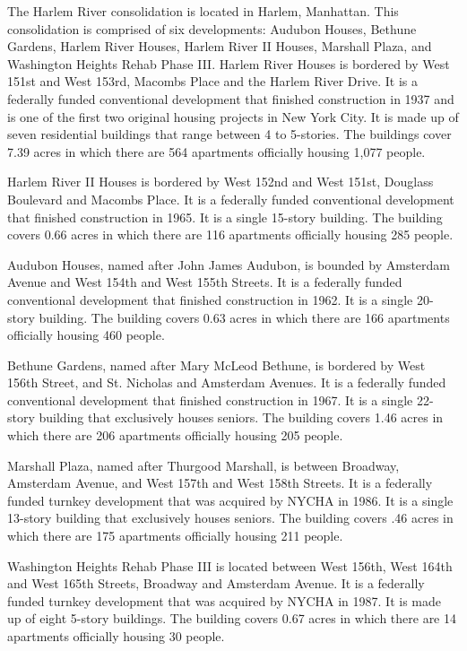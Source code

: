 The Harlem River consolidation is located in Harlem, Manhattan. This consolidation is comprised of six developments: Audubon Houses, Bethune Gardens, Harlem River Houses, Harlem River II Houses, Marshall Plaza, and Washington Heights Rehab Phase III. Harlem River Houses is bordered by West 151st and West 153rd, Macombs Place and the Harlem River Drive. It is a federally funded conventional development that finished construction in 1937 and is one of the first two original housing projects in New York City. It is made up of seven residential buildings that range between 4 to 5-stories. The buildings cover 7.39 acres in which there are 564 apartments officially housing 1,077 people. \par \vspace{.7\baselineskip}Harlem River II Houses is bordered by West 152nd and West 151st, Douglass Boulevard and Macombs Place. It is a federally funded conventional development that finished construction in 1965. It is a single 15-story building. The building covers 0.66 acres in which there are 116 apartments officially housing 285 people. \par \vspace{.7\baselineskip}Audubon Houses, named after John James Audubon, is bounded by Amsterdam Avenue and West 154th and West 155th Streets. It is a federally funded conventional development that finished construction in 1962. It is a single 20-story building. The building covers 0.63 acres in which there are 166 apartments officially housing 460 people. \par \vspace{.7\baselineskip}Bethune Gardens, named after Mary McLeod Bethune, is bordered by West 156th Street, and St. Nicholas and Amsterdam Avenues. It is a federally funded conventional development that finished construction in 1967. It is a single 22-story building that exclusively houses seniors. The building covers 1.46 acres in which there are 206 apartments officially housing 205 people.\par \vspace{.7\baselineskip}Marshall Plaza, named after Thurgood Marshall, is between Broadway, Amsterdam Avenue, and West 157th and West 158th Streets. It is a federally funded turnkey development that was acquired by NYCHA in 1986. It is a single 13-story building that exclusively houses seniors. The building covers .46 acres in which there are 175 apartments officially housing 211 people.\par \vspace{.7\baselineskip}Washington Heights Rehab Phase III is located between West 156th, West 164th and West 165th Streets, Broadway and Amsterdam Avenue. It is a federally funded turnkey development that was acquired by NYCHA in 1987. It is made up of eight 5-story buildings. The building covers 0.67 acres in which there are 14 apartments officially housing 30 people.